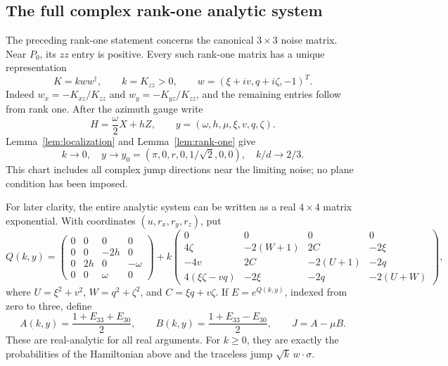 \documentclass[11pt]{article}
\theoremstyle{definition}
\theoremstyle{remark}
\begin{document}
\subsection{The full complex rank-one analytic system}
The preceding rank-one statement concerns the canonical \(3\times3\) noise matrix. Near \(P_0\), its \(zz\) entry is positive. Every such rank-one matrix has a unique representation
\begin{equation}\label{eq:rank-one-chart}
 K=kww^\dagger,\qquad k=K_{zz}>0,\qquad
 w=(\xi+iv,q+i\zeta,-1)^T.
\end{equation}
Indeed \(w_x=-K_{xz}/K_{zz}\) and \(w_y=-K_{yz}/K_{zz}\), and the remaining entries follow from rank one. After the azimuth gauge write
\[
 H=\frac\omega2X+hZ,
 \qquad y=(\omega,h,\mu,\xi,v,q,\zeta).
\]
Lemma~\ref{lem:localization} and Lemma~\ref{lem:rank-one} give
\begin{equation}\label{eq:chart-base}
 k\longrightarrow0,\quad
 y\longrightarrow y_0=(\pi,0,r,0,1/\sqrt2,0,0),\quad
 k/d\longrightarrow2/3.
\end{equation}
This chart includes all complex jump directions near the limiting noise; no plane condition has been imposed.

For later clarity, the entire analytic system can be written as a real \(4\times4\) matrix exponential. With coordinates \((u,r_x,r_y,r_z)\), put
\begin{equation}\label{eq:augmented-Q}
 Q(k,y)=
 \begin{pmatrix}0&0&0&0\\0&0&-2h&0\\0&2h&0&-\omega\\0&0&\omega&0\end{pmatrix}
 +k\begin{pmatrix}
 0&0&0&0\\
 4\zeta&-2(W+1)&2C&-2\xi\\
 -4v&2C&-2(U+1)&-2q\\
 4(\xi\zeta-vq)&-2\xi&-2q&-2(U+W)
 \end{pmatrix},
\end{equation}
where \(U=\xi^2+v^2\), \(W=q^2+\zeta^2\), and \(C=\xi q+v\zeta\). If \(E=e^{Q(k,y)}\), indexed from zero to three, define
\begin{equation}\label{eq:analytic-probabilities}
 A(k,y)=\frac{1+E_{33}+E_{30}}2,\qquad
 B(k,y)=\frac{1+E_{33}-E_{30}}2,\qquad J=A-\mu B.
\end{equation}
These are real-analytic for all real arguments. For \(k\geq0\), they are exactly the probabilities of the Hamiltonian above and the traceless jump \(\sqrt{k}\,w\cdot\sigma\).
\end{document}
